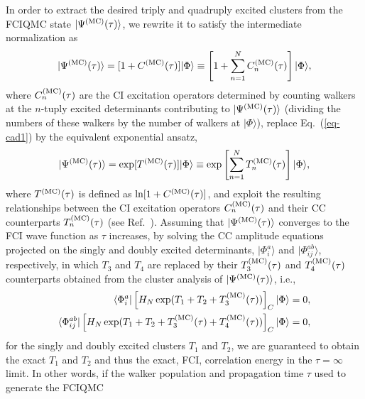 \documentclass[journal=jcp,manuscript=suppinfo]{achemso}
\begin{document}
In order to extract the desired triply and quadruply excited clusters from the FCIQMC
state $|\Psi^{\rm (MC)}(\tau)\rangle$,
we rewrite it to satisfy the intermediate normalization as
\begin{equation}
|\Psi^{\rm (MC)}(\tau)\rangle = [1 + C^{\rm (MC)}(\tau)] |\Phi\rangle
\equiv \left[1 + \sum_{n=1}^{N} C_{n}^{\rm (MC)}(\tau)\right] |\Phi\rangle,
\label{eq-cad1}
\end{equation}
where $C_{n}^{\rm (MC)}(\tau)$ are the CI excitation operators determined by counting walkers
at the $n$-tuply excited determinants contributing to $|\Psi^{\rm (MC)}(\tau)\rangle$ (dividing
the numbers of these walkers by the number of walkers at $|\Phi\rangle$), replace Eq.\ (\ref{eq-cad1}) by the
equivalent exponential ansatz,
\begin{equation}
|\Psi^{\rm (MC)}(\tau)\rangle = \exp[T^{\rm (MC)}(\tau)] |\Phi\rangle
\equiv \exp \left[\sum_{n=1}^{N} T_{n}^{\rm (MC)}(\tau)\right] |\Phi\rangle ,
\label{eq-cad2}
\end{equation}
where $T^{\rm (MC)}(\tau)$ is defined as $\ln [1 +  C^{\rm (MC)}(\tau)]$,
and exploit the resulting relationships between the CI excitation operators $C_{n}^{\rm (MC)}(\tau)$
and their CC counterparts $T_{n}^{\rm (MC)}(\tau)$ (see Ref.\ ).
Assuming that $|\Psi^{\rm (MC)}(\tau)\rangle$ converges to the FCI wave function as $\tau$ increases,
by solving the CC amplitude equations projected on the singly and doubly excited determinants,
$|\Phi_{i}^{a}\rangle$ and $|\Phi_{ij}^{ab}\rangle$, respectively, in which
$T_{3}$ and $T_{4}$ are replaced by their $T_{3}^{\rm (MC)}(\tau)$ and $T_{4}^{\rm (MC)}(\tau)$
counterparts obtained from the cluster analysis of $|\Psi^{\rm (MC)}(\tau)\rangle$, i.e.,
\begin{equation}
\begin{split}
\langle \Phi_{i}^{a} | \left[ H_{N} \exp(T_{1} + T_{2} + T_{3}^{\rm (MC)}(\tau)) \right]_{C} |\Phi\rangle & = 0, \\
\langle \Phi_{ij}^{ab} | \left[H_{N} \exp(T_{1} + T_{2} + T_{3}^{\rm (MC)}(\tau)
+ T_{4}^{\rm (MC)}(\tau))\right]_{C} |\Phi\rangle & = 0,
\end{split}
\label{eq-cad3}
\end{equation}
for the singly and doubly excited clusters $T_{1}$ and $T_{2}$, we are guaranteed to obtain
the exact $T_{1}$ and $T_{2}$ and thus the exact, FCI, correlation energy
in the $\tau = \infty$ limit. In other
words, if the walker population and propagation time $\tau$ used to generate the FCIQMC
\end{document}
